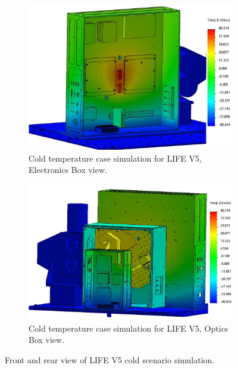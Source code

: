 \begin{figure}
    \centering
    \begin{subfigure}[h]{0.9\textwidth}
        \centering
        \includegraphics[width=\textwidth]{chap3_images/LIFE_V5_initial_images/Iteration_1_ebox_no_labels_FIXED.png}
        \caption{Cold temperature case simulation for LIFE V5, Electronics Box view.}
        \label{fig:LIFE_V5_TA_COLD_EBOX}
    \end{subfigure}
    \begin{subfigure}[h]{0.9\textwidth}
        \centering
        \includegraphics[width=\textwidth]{chap3_images/LIFE_V5_initial_images/Iteration_1_no_labels_FIXED.png}
        \caption{Cold temperature case simulation for LIFE V5, Optics Box view.}
        \label{fig:LIFE_V4_TA_COLD_OBOX}
    \end{subfigure}
    \caption{Front and rear view of LIFE V5 cold scenario simulation.}
    \label{LIFE_V5_Prelim_TA_COLD}
\end{figure}

